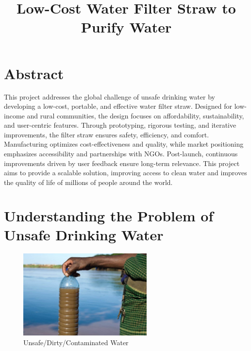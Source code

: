 \documentclass{article}
\title{Low-Cost Water Filter Straw to Purify Water}
\begin{document}
\maketitle

\section*{Abstract}
This project addresses the global challenge of unsafe drinking water by developing a low-cost, portable, and effective water filter straw. Designed for low-income and rural communities, the design focuses on affordability, sustainability, and user-centric features. Through prototyping, rigorous testing, and iterative improvements, the filter straw ensures safety, efficiency, and comfort. Manufacturing optimizes cost-effectiveness and quality, while market positioning emphasizes accessibility and partnerships with NGOs. Post-launch, continuous improvements driven by user feedback ensure long-term relevance. This project aims to provide a scalable solution, improving access to clean water and improves the quality of life of millions of people around the world.

\tableofcontents

\newpage
\section{Understanding the Problem of Unsafe Drinking Water}

\vspace{0.5cm} %

\begin{figure}[h!]
    \centering
    \includegraphics[width=0.6\textwidth]{dirtywater.jpg}
    \caption{Unsafe/Dirty/Contaminated Water}
    \label{fig:dirty_water}
\end{figure}

\vspace{0.5cm}
\vspace{0.3cm}
\end{document}
